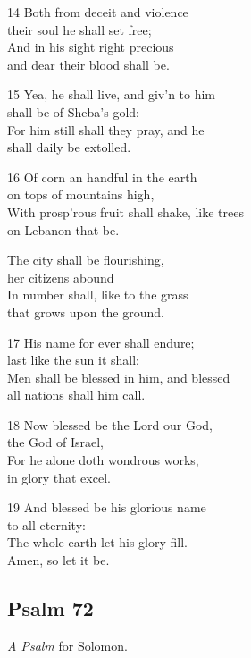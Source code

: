 \begin{multicols}{3}
14 Both from deceit and violence\\
their soul he shall set free;\\
And in his sight right precious\\
and dear their blood shall be.

15 Yea, he shall live, and giv’n to him\\
shall be of Sheba’s gold:\\
For him still shall they pray, and he\\
shall daily be extolled.

16 Of corn an handful in the earth\\
on tops of mountains high,\\
With prosp’rous fruit shall shake, like trees\\
on Lebanon that be.

The city shall be flourishing,\\
her citizens abound\\
In number shall, like to the grass\\
that grows upon the ground.

17 His name for ever shall endure;\\
last like the sun it shall:\\
Men shall be blessed in him, and blessed\\
all nations shall him call.

18 Now blessed be the Lord our God,\\
the God of Israel,\\
For he alone doth wondrous works,\\
in glory that excel.

19 And blessed be his glorious name\\
to all eternity:\\
The whole earth let his glory fill.\\
Amen, so let it be.

\begin{center}
\quad{}\quad{}
\end{center}

\subsection*{Psalm 72}


\emph{A Psalm} for Solomon.




\end{multicols}
